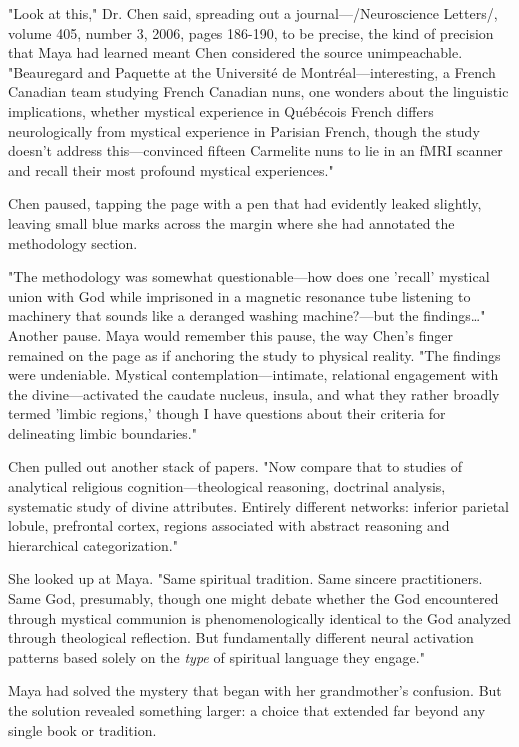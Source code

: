 \documentclass[12pt,twoside]{book}
\begin{document}
"Look at this," Dr. Chen said, spreading out a journal—/Neuroscience Letters/, volume 405, number 3, 2006, pages 186-190, to be precise, the kind of precision that Maya had learned meant Chen considered the source unimpeachable. "Beauregard and Paquette at the Université de Montréal—interesting, a French Canadian team studying French Canadian nuns, one wonders about the linguistic implications, whether mystical experience in Québécois French differs neurologically from mystical experience in Parisian French, though the study doesn't address this—convinced fifteen Carmelite nuns to lie in an fMRI scanner and recall their most profound mystical experiences."

Chen paused, tapping the page with a pen that had evidently leaked slightly, leaving small blue marks across the margin where she had annotated the methodology section.

"The methodology was somewhat questionable—how does one 'recall' mystical union with God while imprisoned in a magnetic resonance tube listening to machinery that sounds like a deranged washing machine?—but the findings\ldots{}" Another pause. Maya would remember this pause, the way Chen's finger remained on the page as if anchoring the study to physical reality. "The findings were undeniable. Mystical contemplation—intimate, relational engagement with the divine—activated the caudate nucleus, insula, and what they rather broadly termed 'limbic regions,' though I have questions about their criteria for delineating limbic boundaries."

Chen pulled out another stack of papers. "Now compare that to studies of analytical religious cognition—theological reasoning, doctrinal analysis, systematic study of divine attributes. Entirely different networks: inferior parietal lobule, prefrontal cortex, regions associated with abstract reasoning and hierarchical categorization."

She looked up at Maya. "Same spiritual tradition. Same sincere practitioners. Same God, presumably, though one might debate whether the God encountered through mystical communion is phenomenologically identical to the God analyzed through theological reflection. But fundamentally different neural activation patterns based solely on the \emph{type} of spiritual language they engage."

Maya had solved the mystery that began with her grandmother's confusion. But the solution revealed something larger: a choice that extended far beyond any single book or tradition.
\end{document}
